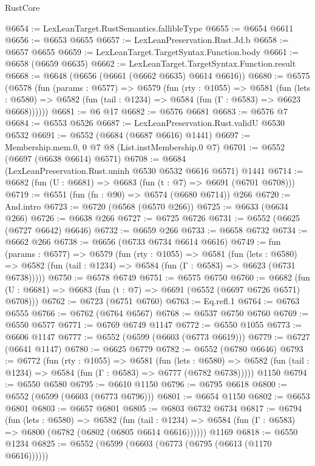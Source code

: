 \begin{lexlean}{RustCore}
\begin{coremodule}
@6654 := LexLeanTarget.RustSemantics.fallibleType
@6655 := @6654 @6611
@6656 := @6653 @6655
@6657 := LexLeanPreservation.Rust.Jd.b
@6658 := @6657 @6655
@6659 := LexLeanTarget.TargetSyntax.Function.body
@6661 := @6658 (@6659 @6635)
@6662 := LexLeanTarget.TargetSyntax.Function.result
@6668 := @6648 (@6656 (@6661 (@6662 @6635) @6614 @6616))
@6680 := @6575
    (@6578
      (fun (params : @6577) =>
      @6579
        (fun (rty : @1055) =>
        @6581
          (fun (lets : @6580) =>
          @6582 (fun (tail : @1234) => @6584 (fun (Γ : @6583) => @6623 @6668))))))
@6681 := @6 @17
@6682 := @6576 @6681
@6683 := @6576 @7
@6684 := @6553 @6526
@6687 := LexLeanPreservation.Rust.validU @6530 @6532
@6691 := @6552 (@6684 (@6687 @6616) @1441)
@6697 := Membership.mem.{0, 0} @7 @8 (List.instMembership.{0} @7)
@6701 := @6552 (@6697 (@6638 @6614) @6571)
@6708 := @6684 (LexLeanPreservation.Rust.uninh @6530 @6532 @6616 @6571) @1441
@6714 := @6682 (fun (U : @6681) => @6683 (fun (t : @7) => @6691 (@6701 @6708)))
@6719 := @6551 (fun (fn : @90) => @6574 (@6680 @6714)) @266
@6720 := And.intro
@6723 := @6720 (@6568 (@6570 @266))
@6725 := @6633 (@6634 @266)
@6726 := @6638 @266
@6727 := @6725 @6726
@6731 := @6552 (@6625 (@6727 @6642) @6646)
@6732 := @6659 @266
@6733 := @6658 @6732
@6734 := @6662 @266
@6738 := @6656 (@6733 @6734 @6614 @6616)
@6749 := fun (params : @6577) =>
  @6579
    (fun (rty : @1055) =>
    @6581
      (fun (lets : @6580) =>
      @6582 (fun (tail : @1234) => @6584 (fun (Γ : @6583) => @6623 (@6731 @6738)))))
@6750 := @6578 @6749
@6751 := @6575 @6750
@6760 := @6682 (fun (U : @6681) => @6683 (fun (t : @7) => @6691 (@6552 (@6697 @6726 @6571) @6708)))
@6762 := @6723 (@6751 @6760)
@6763 := Eq.refl.{1}
@6764 := @6763 @6555
@6766 := @6762 (@6764 @6567)
@6768 := @6537 @6750 @6760
@6769 := @6550 @6577
@6771 := @6769 @6749 @1147
@6772 := @6550 @1055
@6773 := @6606 @1147
@6777 := @6552 (@6599 (@6603 (@6773 @6619)))
@6779 := @6727 (@6641 @1147)
@6780 := @6625 @6779
@6782 := @6552 (@6780 @6646)
@6793 := @6772
    (fun (rty : @1055) =>
    @6581
      (fun (lets : @6580) =>
      @6582 (fun (tail : @1234) => @6584 (fun (Γ : @6583) => @6777 (@6782 @6738)))))
    @1150
@6794 := @6550 @6580
@6795 := @6610 @1150
@6796 := @6795 @6618
@6800 := @6552 (@6599 (@6603 (@6773 @6796)))
@6801 := @6654 @1150
@6802 := @6653 @6801
@6803 := @6657 @6801
@6805 := @6803 @6732 @6734
@6817 := @6794
    (fun (lets : @6580) =>
    @6582
      (fun (tail : @1234) => @6584 (fun (Γ : @6583) => @6800 (@6782 (@6802 (@6805 @6614 @6616))))))
    @1169
@6818 := @6550 @1234
@6825 := @6552 (@6599 (@6603 (@6773 (@6795 (@6613 (@1170 @6616))))))

\end{coremodule}
\end{lexlean}
